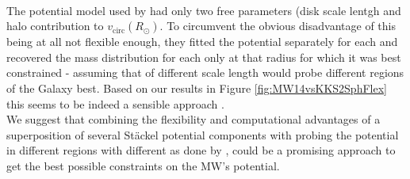 \\The potential model used by \citet{2013ApJ...779..115B} had only two free parameters (disk scale lentgh and halo contribution to $v_\text{circ}(R_\odot)$. To circumvent the obvious disadvantage of this being at all not flexible enough, they fitted the potential separately for each \MAP{} and recovered the mass distribution for each \MAP{} only at that radius for which it was best constrained - assuming that \MAPs{} of different scale length would probe different regions of the Galaxy best. Based on our results in Figure \ref{fig:MW14vsKKS2SphFlex} this seems to be indeed a sensible approach .
\\We suggest that combining the flexibility and computational advantages of a superposition of several St\"{a}ckel potential components with probing the potential in different regions with different \MAPs{} as done by \citet{2013ApJ...779..115B}, could be a promising approach to get the best possible constraints on the MW's potential.\\


